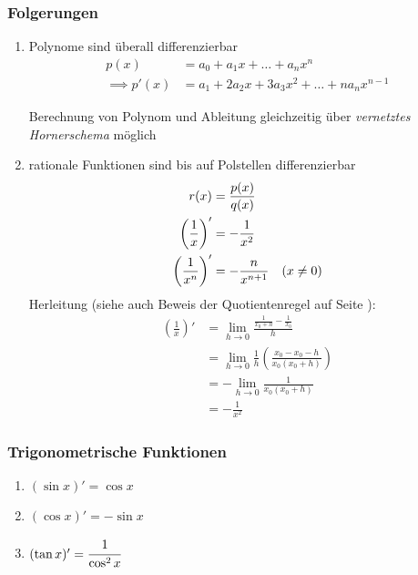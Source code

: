 
\subsubsection*{Folgerungen}

\begin{enumerate}
	\item Polynome sind überall differenzierbar \\
	\begin{align*}
		p(x) &= a_0 + a_1 x + \dots + a_n x^n \\
		\implies p'(x) &= a_1 + 2 a_2 x + 3 a_3 x^2 + \dots + n a_n x^{n-1}
	\end{align*}
	\begin{note}Berechnung von Polynom und Ableitung gleichzeitig über \emph{vernetztes Hornerschema} möglich\end{note}
	\item rationale Funktionen sind bis auf Polstellen differenzierbar
	\begin{align*}
		r(x) &= \frac{p(x)}{q(x)} \\
		\left( \frac{1}{x} \right)' &= -\frac{1}{x^2} \\
		\left( \frac{1}{x^n} \right)' &= -\frac{n}{x^{n+1}} \hspace{10px} (x \neq 0)
	\end{align*}
	Herleitung (siehe auch Beweis der Quotientenregel auf Seite \pageref{proof:quotregel}):
	\begin{align*}
		\left( \frac{1}{x} \right)' &= \lim\limits_{h \rightarrow 0} \frac{\frac{1}{x_0+h} - \frac{1}{x_0}}{h} \\
		&= \lim\limits_{h \rightarrow 0} \frac{1}{h} \left( \frac{x_0 - x_0 - h}{x_0 (x_0+h)} \right) \\
		&= - \lim\limits_{h \rightarrow 0} \frac{1}{x_0 (x_0 + h)} \\
		&= -\frac{1}{x^2}
	\end{align*}
\end{enumerate}

\subsubsection*{Trigonometrische Funktionen}
\begin{enumerate}
	\item $ (\sin x)' = \cos x $
	\item $ (\cos x)' = - \sin x $
	\item $ (\tan x)' = \cfrac{1}{\cos^2 x} $
\end{enumerate}

